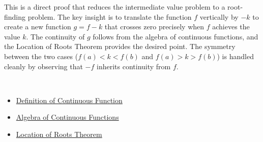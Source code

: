 \begin{remark*}
This is a direct proof that reduces the intermediate value problem to a root-finding problem. The key insight is to translate the function $f$ vertically by $-k$ to create a new function $g = f - k$ that crosses zero precisely when $f$ achieves the value $k$. The continuity of $g$ follows from the algebra of continuous functions, and the Location of Roots Theorem provides the desired point. The symmetry between the two cases ($f(a) < k < f(b)$ and $f(a) > k > f(b)$) is handled cleanly by observing that $-f$ inherits continuity from $f$.
\end{remark*}

\begin{remark*}[Dependencies]~\\
\begin{itemize}
  \item \hyperref[def:continuous-function]{Definition of Continuous Function}
  \item \hyperref[thm:algebra-continuous-functions]{Algebra of Continuous Functions}
  \item \hyperref[thm:location-roots]{Location of Roots Theorem}
\end{itemize}
\end{remark*}

\clearpage
